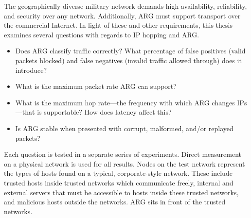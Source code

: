 \par The geographically diverse military network demands high availability, reliability, and security over any network. Additionally, \ac{ARG} must support transport over the commercial Internet. In light of these and other requirements, this thesis examines several questions with regards to \ac{IP} hopping and \ac{ARG}.
\begin{itemize}
	\item Does \ac{ARG} classify traffic correctly? What percentage of false positives (valid packets blocked) and false negatives (invalid traffic allowed through) does it introduce?
	\item What is the maximum packet rate \ac{ARG} can support?
	\item What is the maximum hop rate---the frequency with which \ac{ARG} changes \acp{IP}---that is supportable? How does latency affect this?
	\item Is \ac{ARG} stable when presented with corrupt, malformed, and/or replayed packets?
\end{itemize}

\par Each question is tested in a separate series of experiments. Direct measurement on a physical network is used for all results. Nodes on the test network represent the types of hosts found on a typical, corporate-style network. These include trusted hosts inside trusted networks which communicate freely, internal and external servers that must be accessible to hosts inside these trusted networks, and malicious hosts outside the networks. \ac{ARG} sits in front of the trusted networks. 



